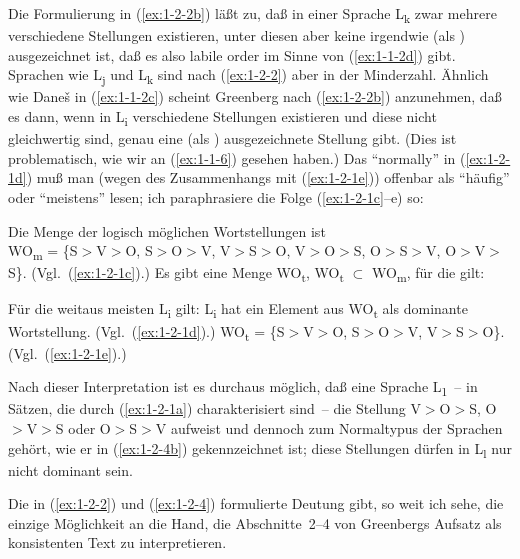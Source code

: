 \documentclass[output=paper]{langsci/langscibook}
\begin{document}
Die Formulierung in (\ref{ex:1-2-2b}) läßt zu, daß in einer Sprache L\textsubscript{k} zwar mehrere verschiedene Stellungen existieren, unter diesen aber keine irgendwie (\zb als )
ausgezeichnet ist, daß es also labile order im Sinne von (\ref{ex:1-1-2d}) gibt. Sprachen wie L\textsubscript{j} und L\textsubscript{k}
sind nach (\ref{ex:1-2-2}) aber in der Minderzahl. Ähnlich wie Dane\v{s} in (\ref{ex:1-1-2c}) scheint Greenberg
nach (\ref{ex:1-2-2b}) anzunehmen, daß es dann, wenn in L\textsubscript{i} verschiedene Stellungen existieren
und diese nicht gleichwertig sind, genau eine (als ) ausgezeichnete Stellung
gibt. (Dies ist problematisch, wie wir an (\ref{ex:1-1-6}) gesehen haben.)
Das "`normally"' in (\ref{ex:1-2-1d}) muß man (wegen des Zusammenhangs mit (\ref{ex:1-2-1e})) offenbar als "`häufig"' oder "`meistens"' lesen; ich paraphrasiere die Folge (\ref{ex:1-2-1c}–e) so:
\begin{exe}
\ex\label{ex:1-2-4}
\begin{xlist}
\ex\label{ex:1-2-4a} Die Menge der logisch möglichen Wortstellungen ist \\
WO\textsubscript{m} = \{S$>$V$>$O, S$>$O$>$V, V$>$S$>$O, V$>$O$>$S, O$>$S$>$V, O$>$V$>$S\}. (Vgl.\ (\ref{ex:1-2-1c}).)
\ex\label{ex:1-2-4b} Es gibt eine Menge WO\textsubscript{t}, WO\textsubscript{t} $\subset$ WO\textsubscript{m}, für die gilt:
\begin{xlist}
\ex\label{ex:1-2-4bi} Für die weitaus meisten L\textsubscript{i} gilt:
L\textsubscript{i} hat ein Element aus WO\textsubscript{t} als dominante Wortstellung. (Vgl.\ (\ref{ex:1-2-1d}).)
\ex\label{ex:1-2-4bii} WO\textsubscript{t} = \{S$>$V$>$O, S$>$O$>$V, V$>$S$>$O\}. (Vgl.\ (\ref{ex:1-2-1e}).)
\end{xlist}
\end{xlist}
\end{exe}
Nach dieser Interpretation ist es durchaus möglich, daß eine Sprache L\textsubscript{1}~-- in Sätzen,
die durch (\ref{ex:1-2-1a}) charakterisiert sind~-- die Stellung V$>$O$>$S, O$>$V$>$S oder O$>$S$>$V
aufweist und dennoch zum Normaltypus der Sprachen gehört, wie er in (\ref{ex:1-2-4b}) gekennzeichnet ist; diese Stellungen dürfen in L\textsubscript{l} nur nicht dominant sein.

Die in (\ref{ex:1-2-2}) und (\ref{ex:1-2-4}) formulierte Deutung gibt, so weit ich sehe, die einzige Möglichkeit an die Hand, die Abschnitte~2–4 von Greenbergs Aufsatz als konsistenten Text
zu interpretieren.
\end{document}
